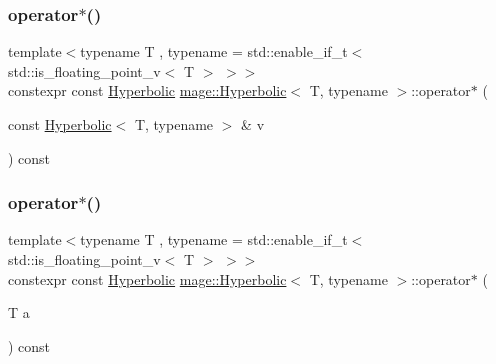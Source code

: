 \subsubsection{\texorpdfstring{operator$\ast$()}{operator*()}\hspace{0.1cm}{\footnotesize\ttfamily [1/2]}}
{\footnotesize\ttfamily template$<$typename T , typename  = std\+::enable\+\_\+if\+\_\+t$<$ std\+::is\+\_\+floating\+\_\+point\+\_\+v$<$ T $>$ $>$$>$ \\
constexpr const \mbox{\hyperlink{structmage_1_1_hyperbolic}{Hyperbolic}} \mbox{\hyperlink{structmage_1_1_hyperbolic}{mage\+::\+Hyperbolic}}$<$ T, typename $>$\+::operator$\ast$ (\begin{DoxyParamCaption}\item[{const \mbox{\hyperlink{structmage_1_1_hyperbolic}{Hyperbolic}}$<$ T, typename $>$ \&}]{v }\end{DoxyParamCaption}) const\hspace{0.3cm}{\ttfamily [noexcept]}}

\mbox{\label{structmage_1_1_hyperbolic_a1aee33b8468529e392bdd04a551abd4e}} 
\subsubsection{\texorpdfstring{operator$\ast$()}{operator*()}\hspace{0.1cm}{\footnotesize\ttfamily [2/2]}}
{\footnotesize\ttfamily template$<$typename T , typename  = std\+::enable\+\_\+if\+\_\+t$<$ std\+::is\+\_\+floating\+\_\+point\+\_\+v$<$ T $>$ $>$$>$ \\
constexpr const \mbox{\hyperlink{structmage_1_1_hyperbolic}{Hyperbolic}} \mbox{\hyperlink{structmage_1_1_hyperbolic}{mage\+::\+Hyperbolic}}$<$ T, typename $>$\+::operator$\ast$ (\begin{DoxyParamCaption}\item[{T}]{a }\end{DoxyParamCaption}) const\hspace{0.3cm}{\ttfamily [noexcept]}}

\mbox{\label{structmage_1_1_hyperbolic_a20668a0c836528a217de1c27ac306be5}} 

